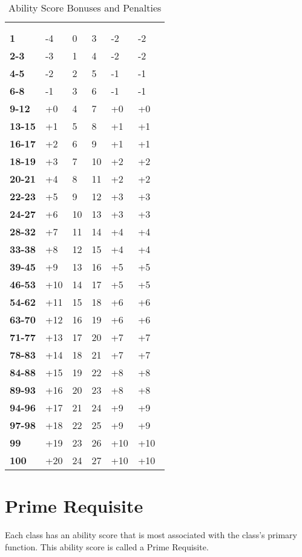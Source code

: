 \begin{multicols*}{2}
\begin {table}[H]
  \caption{Ability Score Bonuses and Penalties}\label{tab:Ability Score Bonuses and Penalties}
	\begin{tabularx}{\columnwidth}{>{\bfseries}YYYYYM{.44in}}
		\thead{} &  \thead{} &  &  \\
		 &  &  &  &  & \\
		1 & -4 & 0 & 3 & -2 & -2\\
		2-3 & -3 & 1 & 4 & -2 & -2\\
		4-5 & -2 & 2 & 5 & -1 & -1\\
		6-8 & -1 & 3 & 6 & -1 & -1\\
		9-12 & +0 & 4 & 7 & +0 & +0\\
		13-15 & +1 & 5 & 8 & +1 & +1\\
		16-17 & +2 & 6 & 9 & +1 & +1\\
		18-19 & +3 & 7 & 10 & +2 & +2\\
		20-21 & +4 & 8 & 11 & +2 & +2\\
		22-23 & +5 & 9 & 12 & +3 & +3\\
		24-27 & +6 & 10 & 13 & +3 & +3\\
		28-32 & +7 & 11 & 14 & +4 & +4\\
		33-38 & +8 & 12 & 15 & +4 & +4\\
		39-45 & +9 & 13 & 16 & +5 & +5\\
		46-53 & +10 & 14 & 17 & +5 & +5\\
		54-62 & +11 & 15 & 18 & +6 & +6\\
		63-70 & +12 & 16 & 19 & +6 & +6\\
		71-77 & +13 & 17 & 20 & +7 & +7\\
		78-83 & +14 & 18 & 21 & +7 & +7\\
		84-88 & +15 & 19 & 22 & +8 & +8\\
		89-93 & +16 & 20 & 23 & +8 & +8\\
		94-96 & +17 & 21 & 24 & +9 & +9\\
		97-98 & +18 & 22 & 25 & +9 & +9\\
		99 & +19 & 23 & 26 & +10 & +10\\
		100 & +20 & 24 & 27 & +10 & +10\
  \end {tabularx}
\end {table}

\section{Prime Requisite}\label{sec:Prime Requisite}
Each class has an ability score that is most associated with the class’s primary function. This ability score is called a Prime Requisite.


\end{multicols*}

